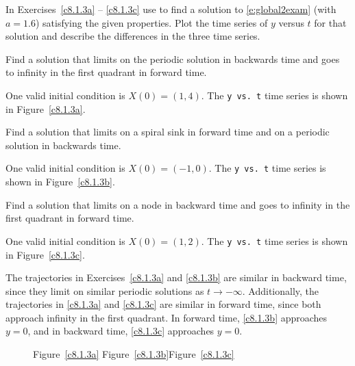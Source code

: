 \documentclass{ximera}
\begin{document}
\noindent In Exercises~\ref{c8.1.3a} -- \ref{c8.1.3c} use {\pplane}
to find a solution to \eqref{e:global2exam} (with $a=1.6$) satisfying the 
given properties. Plot the time series of $y$ versus $t$ for that solution 
and describe the differences in the three time series.
\begin{exercise} \label{c8.1.3a}
Find a solution that limits on the periodic solution in backwards time and 
goes to infinity in the first quadrant in forward time.

\begin{solution}

One valid initial condition is $X(0) = (1,4)$.  The {\tt y vs.\ t}
time series is shown in Figure~\ref{c8.1.3a}.

\end{solution}
\end{exercise}
\begin{exercise} \label{c8.1.3b}
Find a solution that limits on a spiral sink in forward time and on a periodic 
solution in backwards time.

\begin{solution}

One valid initial condition is $X(0) = (-1,0)$.  The {\tt y vs.\ t}
time series is shown in Figure~\ref{c8.1.3b}.


\end{solution}
\end{exercise}
\begin{exercise} \label{c8.1.3c}
Find a solution that limits on a node in backward time and goes to infinity 
in the first quadrant in forward time.

\begin{solution}
One valid initial condition is $X(0) = (1,2)$.  The
{\tt y vs.\ t} time series is shown in Figure~\ref{c8.1.3c}.

\para The trajectories in Exercises~\ref{c8.1.3a} and \ref{c8.1.3b} are
similar in backward time, since they limit on similar periodic
solutions as $t \rightarrow -\infty$.  Additionally, the trajectories
in \ref{c8.1.3a} and \ref{c8.1.3c} are similar in forward time, since
both approach infinity in the first quadrant.  In forward time,
\ref{c8.1.3b} approaches $y = 0$, and in backward time, \ref{c8.1.3c}
approaches $y = 0$.

\begin{figure}[htb]
                       \centerline{%
                       }
		\centerline{Figure~\ref{c8.1.3a}\hspace{1.2in}
Figure~\ref{c8.1.3b}\hspace{1.2in}Figure~\ref{c8.1.3c}}
\end{figure}




\end{solution}
\end{exercise}
\end{document}
